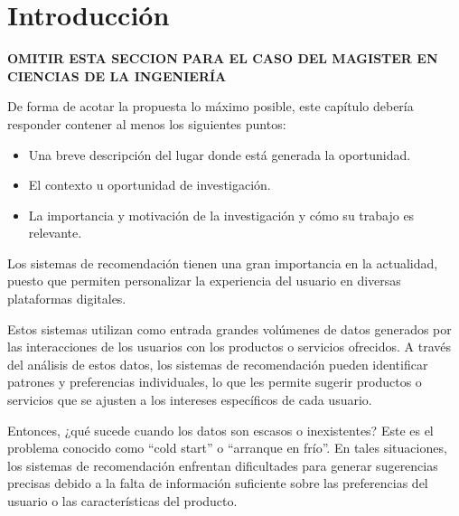 \chapter{Introducción} %
\label{sec:Introduccion} %

\textbf{OMITIR ESTA SECCION PARA EL CASO DEL MAGISTER EN CIENCIAS DE LA INGENIER\'IA}

De forma de acotar la propuesta lo máximo posible, este capítulo debería responder contener al menos los siguientes puntos:
\begin{itemize}
\item Una breve descripción del lugar donde está generada la oportunidad.
\item El contexto u oportunidad de investigación.
\item La importancia y motivación de la investigación y cómo su trabajo es relevante.
\end{itemize}

\newpage
Los sistemas de recomendación tienen una gran importancia en la actualidad, puesto que permiten personalizar la experiencia del usuario en diversas plataformas digitales. 

Estos sistemas utilizan como entrada grandes volúmenes de datos generados por las interacciones de los usuarios con los productos o servicios ofrecidos. A través del análisis de estos datos, los sistemas de recomendación pueden identificar patrones y preferencias individuales, lo que les permite sugerir productos o servicios que se ajusten a los intereses específicos de cada usuario.

Entonces, ¿qué sucede cuando los datos son escasos o inexistentes? Este es el problema conocido como \enquote{cold start} o \enquote{arranque en frío}. En tales situaciones, los sistemas de recomendación enfrentan dificultades para generar sugerencias precisas debido a la falta de información suficiente sobre las preferencias del usuario o las características del producto.


